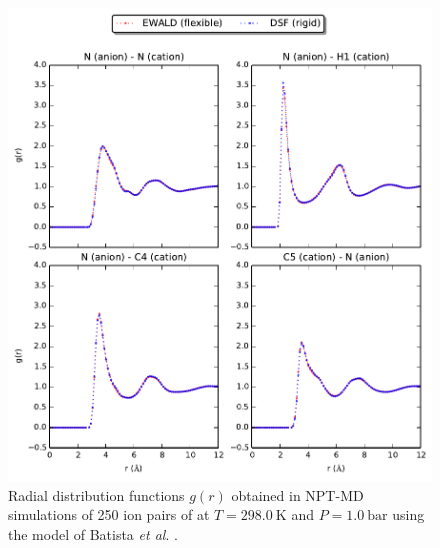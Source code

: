 \documentclass[3p,onecolumn]{elsarticle}
\begin{document}
\begin{figure}[ht]
\includegraphics[]{rdf-Batista}
\caption{Radial distribution functions $g(r)$ obtained in NPT-MD simulations of 250 ion pairs of \ce{[emim][B(CN)4]} at $T = 298.0~\mathrm{K}$ and $P = 1.0~\mathrm{bar}$ using the model of Batista \textit{et al}. \cite{Batista_2015}.}
\label{fig:rdf-Batista}
\end{figure}
\end{document}
